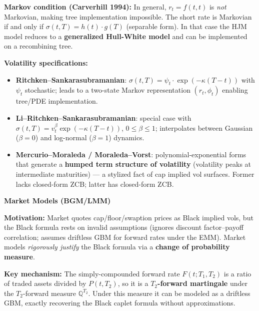 \documentclass[12pt,a4paper]{article}
\begin{document}
\vspace{0.3em}
\noindent\textbf{Markov condition (Carverhill 1994):} In general, $r_t = f(t,t)$ is \emph{not} Markovian, making tree implementation impossible. The short rate is Markovian if and only if $\sigma(t,T) = h(t)\cdot g(T)$ (separable form). In that case the HJM model reduces to a \textbf{generalized Hull-White model} and can be implemented on a recombining tree.

\vspace{0.3em}
\noindent\textbf{Volatility specifications:}
\begin{itemize}
    \item \textbf{Ritchken--Sankarasubramanian}: $\sigma(t,T) = \psi_t \cdot \exp(-\kappa(T-t))$ with $\psi_t$ stochastic; leads to a two-state Markov representation $(r_t, \phi_t)$ enabling tree/PDE implementation.
    \item \textbf{Li--Ritchken--Sankarasubramanian}: special case with $\sigma(t,T) = v_t^\beta \exp(-\kappa(T-t))$, $0 \le \beta \le 1$; interpolates between Gaussian ($\beta=0$) and log-normal ($\beta=1$) dynamics.
    \item \textbf{Mercurio--Moraleda / Moraleda--Vorst}: polynomial-exponential forms that generate a \textbf{humped term structure of volatility} (volatility peaks at intermediate maturities) — a stylized fact of cap implied vol surfaces. Former lacks closed-form ZCB; latter has closed-form ZCB.
\end{itemize}

\vspace{0.5em}
\noindent\textbf{Market Models (BGM/LMM)}

\vspace{0.3em}
\noindent \textbf{Motivation:} Market quotes cap/floor/swaption prices as Black implied vols, but the Black formula rests on invalid assumptions (ignores discount factor–payoff correlation; assumes driftless GBM for forward rates under the EMM). Market models \emph{rigorously justify} the Black formula via a \textbf{change of probability measure}.

\vspace{0.3em}
\noindent\textbf{Key mechanism:} The simply-compounded forward rate $F(t;T_1,T_2)$ is a ratio of traded assets divided by $P(t,T_2)$, so it is a \textbf{$T_2$-forward martingale} under the $T_2$-forward measure $\mathbb{Q}^{T_2}$. Under this measure it can be modeled as a driftless GBM, exactly recovering the Black caplet formula without approximations.
\end{document}
